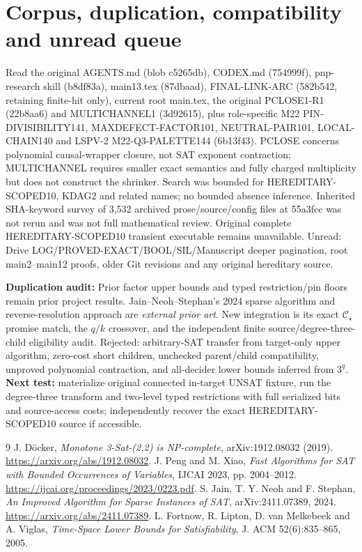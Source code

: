 \documentclass[11pt]{article}
\newcommand{\CS}{\mathcal C_\star}
\begin{document}
\section{Corpus, duplication, compatibility and unread queue}
Read the original AGENTS.md (blob c5265db), CODEX.md (754999f), pnp-research skill (b8df83a), main13.tex (87dbaad), FINAL-LINK-ARC (582b542, retaining finite-hit only), current root main.tex, the original PCLOSE1-R1 (22b8aa6) and MULTICHANNEL1 (3d92615), plus role-specific M22 PIN-DIVISIBILITY141, MAXDEFECT-FACTOR101, NEUTRAL-PAIR101, LOCAL-CHAIN140 and LSPV-2 M22-Q3-PALETTE144 (6b13f43). PCLOSE concerns polynomial causal-wrapper closure, not SAT exponent contraction; MULTICHANNEL requires smaller exact semantics and fully charged multiplicity but does not construct the shrinker. Search was bounded for HEREDITARY-SCOPED10, KDAG2 and related names; no bounded absence inference. Inherited SHA-keyword survey of 3,532 archived prose/source/config files at 55a3fcc was not rerun and was not full mathematical review. Original complete HEREDITARY-SCOPED10 transient executable remains unavailable. Unread: Drive LOG/PROVED-EXACT/BOOL/SIL/Manuscript deeper pagination, root main2--main12 proofs, older Git revisions and any original hereditary source.

\textbf{Duplication audit:} Prior factor upper bounds and typed restriction/pin floors remain prior project results. Jain--Neoh--Stephan's 2024 sparse algorithm and reverse-resolution approach are \emph{external prior art}. New integration is its exact \(\CS\) promise match, the \(q/k\) crossover, and the independent finite source/degree-three-child eligibility audit. Rejected: arbitrary-SAT transfer from target-only upper algorithm, zero-cost short children, unchecked parent/child compatibility, unproved polynomial contraction, and all-decider lower bounds inferred from \(3^q\). \textbf{Next test:} materialize original connected in-target UNSAT fixture, run the degree-three transform and two-level typed restrictions with full serialized bits and source-access costs; independently recover the exact HEREDITARY-SCOPED10 source if accessible.

\begin{thebibliography}{9}
 J. D\"ocker, \emph{Monotone 3-Sat-(2,2) is NP-complete}, arXiv:1912.08032 (2019). \url{https://arxiv.org/abs/1912.08032}.
 J. Peng and M. Xiao, \emph{Fast Algorithms for SAT with Bounded Occurrences of Variables}, IJCAI 2023, pp. 2004--2012. \url{https://ijcai.org/proceedings/2023/0223.pdf}.
 S. Jain, T. Y. Neoh and F. Stephan, \emph{An Improved Algorithm for Sparse Instances of SAT}, arXiv:2411.07389, 2024. \url{https://arxiv.org/abs/2411.07389}.
 L. Fortnow, R. Lipton, D. van Melkebeek and A. Viglas, \emph{Time-Space Lower Bounds for Satisfiability}, J. ACM 52(6):835--865, 2005.
\end{thebibliography}
\end{document}
